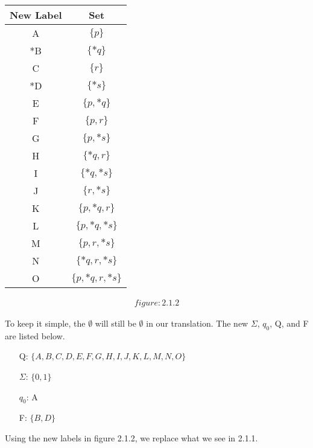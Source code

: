 \documentclass{article}
\theoremstyle{theorem}
\theoremstyle{definition}
\theoremstyle{remark}
\begin{document}
\begin{table}[h!] %
\centering
\begin{tabular}{c|c}
    New Label & Set \\
    \hline
    A & $\{p\}$ \\
    *B & $\{*q\}$ \\
    C & $\{r\}$ \\
    *D & $\{*s\}$ \\
    E & $\{p, *q\}$ \\
    F & $\{p, r\}$ \\
    G & $\{p, *s\}$ \\
    H & $\{*q, r\}$ \\
    I & $\{*q, *s\}$ \\
    J & $\{r, *s\}$ \\
    K & $\{p, *q, r\}$ \\
    L & $\{p, *q, *s\}$ \\
    M & $\{p, r, *s\}$ \\
    N & $\{*q, r, *s\}$ \\
    O & $\{p, *q, r, *s\}$ \\
\end{tabular}
\begin{align*}
figure:2.1.2
\end{align*}
\end{table}

\pagebreak
To keep it simple, the $\emptyset$ will still be $\emptyset$ in our translation.
The new $\Sigma$, $q_0$, Q, and F are listed below.
\begin{enumerate}
    \item[Q:] $\{A, B, C, D, E, F, G, H, I, J, K, L, M, N, O\}$
    \item[$\Sigma$:] $\{0,1\}$
    \item[$q_0$:] A
    \item[F:] $\{B,D\}$
\end{enumerate}

Using the new labels in figure 2.1.2, we replace what we see in 2.1.1.
\end{document}
